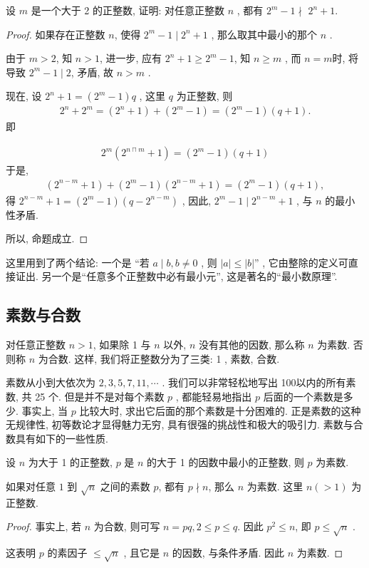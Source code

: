 \begin{example}
	设 $m$ 是一个大于 2 的正整数, 证明: 对任意正整数 $n$ , 都有 $2^{m}-1 \nmid$ $2^{n}+1$.
\end{example}
\begin{proof}
	如果存在正整数 $n$, 使得 $2^{m}-1 \mid 2^{n}+1$ , 那么取其中最小的那个 $n$ .

	由于 $m>2$, 知 $n>1$, 进一步, 应有 $2^{n}+1 \geqslant 2^{m}-1$, 知 $n \geqslant m$ , 而 $n=m$时, 将导致 $2^{m}-1 \mid 2$, 矛盾, 故 $n>m$ .

	现在, 设 $2^{n}+1=\left(2^{m}-1\right) q$ , 这里 $q$ 为正整数, 则
	\begin{align*}
		2^{n}+2^{m}=\left(2^{n}+1\right)+\left(2^{m}-1\right)=\left(2^{m}-1\right)(q+1).
	\end{align*}
	即
	
\begin{align*}
		2^{m}\left(2^{n \sqcap m}+1\right)=\left(2^{m}-1\right)(q+1)
	\end{align*}
	于是,
	\begin{align*}
		\left(2^{n-m}+1\right)+\left(2^{m}-1\right)\left(2^{n-m}+1\right)=\left(2^{m}-1\right)(q+1),
	\end{align*}
	得 $2^{n-m}+1=\left(2^{m}-1\right)\left(q-2^{n-m}\right)$ , 因此,  $2^{m}-1 \mid 2^{n-m}+1$ , 与 $n$ 的最小性矛盾.

	所以, 命题成立.
\end{proof}
\begin{note}
	这里用到了两个结论: 一个是 “若 $a \mid b, b \neq 0$ , 则 $|a| \leqslant|b| $” , 它由整除的定义可直接证出. 另一个是“任意多个正整数中必有最小元”, 这是著名的“最小数原理”.
\end{note}

\subsection{素数与合数}
对任意正整数 $n>1$, 如果除 1 与 $n$ 以外,  $n$ 没有其他的因数, 那么称 $n$ 为素数. 否则称 $n$ 为合数. 这样, 我们将正整数分为了三类:  1 , 素数, 合数.

素数从小到大依次为 $2,3,5,7,11, \cdots$ . 我们可以非常轻松地写出 100以内的所有素数, 共 25 个. 但是并不是对每个素数 $p$ , 都能轻易地指出 $p$ 后面的一个素数是多少. 事实上, 当 $p$ 比较大时, 求出它后面的那个素数是十分困难的. 正是素数的这种无规律性, 初等数论才显得魅力无穷, 具有很强的挑战性和极大的吸引力. 素数与合数具有如下的一些性质.

\begin{property}
	设 $n$ 为大于 1 的正整数, $p$ 是 $n$ 的大于 1 的因数中最小的正整数, 则 $p$ 为素数.
\end{property}
\begin{property}
	如果对任意 $1$ 到 $\sqrt{n}$ 之间的素数 $p$, 都有 $p \nmid n$, 那么 $n$ 为素数. 这里 $n(>1)$ 为正整数.
\end{property}
\begin{proof}
	事实上, 若 $n$ 为合数, 则可写 $n=p q, 2 \leqslant p \leqslant q$. 因此 $p^{2} \leqslant n$, 即 $p \leqslant \sqrt{n}$ .


这表明 $p$ 的素因子 $\leqslant \sqrt{n}$ , 且它是 $n$ 的因数, 与条件矛盾. 因此 $n$ 为素数.
\end{proof}

